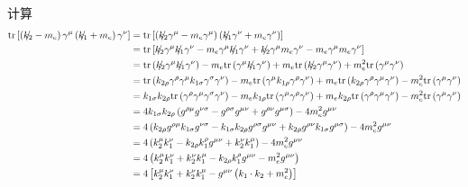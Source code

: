 计算
\begin{equation}
    \begin{aligned}
        \mathrm{tr}\left[ \left( \slashed{k_2}-m_e \right) \gamma ^{\mu}\left( \slashed{k_1}+m_e \right) \gamma ^{\nu} \right] &=\mathrm{tr}\left[ \left( \slashed{k_2}\gamma ^{\mu}-m_e\gamma ^{\mu} \right) \left( \slashed{k_1}\gamma ^{\nu}+m_e\gamma ^{\nu} \right) \right] 
\\
&=\mathrm{tr}\left[ \slashed{k_2}\gamma ^{\mu}\slashed{k_1}\gamma ^{\nu}-m_e\gamma ^{\mu}\slashed{k_1}\gamma ^{\nu}+\slashed{k_2}\gamma ^{\mu}m_e\gamma ^{\nu}-m_e\gamma ^{\mu}m_e\gamma ^{\nu} \right] 
\\
&=\mathrm{tr}\left( \slashed{k_2}\gamma ^{\mu}\slashed{k_1}\gamma ^{\nu} \right) -m_e\mathrm{tr}\left( \gamma ^{\mu}\slashed{k_1}\gamma ^{\nu} \right) +m_e\mathrm{tr}\left( \slashed{k_2}\gamma ^{\mu}\gamma ^{\nu} \right) +m_{e}^{2}\mathrm{tr}\left( \gamma ^{\mu}\gamma ^{\nu} \right) 
\\
&=\mathrm{tr}\left( k_{2\rho}\gamma ^{\rho}\gamma ^{\mu}k_{1\sigma}\gamma ^{\sigma}\gamma ^{\nu} \right) -m_e\mathrm{tr}\left( \gamma ^{\mu}k_{1\rho}\gamma ^{\rho}\gamma ^{\nu} \right) +m_e\mathrm{tr}\left( k_{2\rho}\gamma ^{\rho}\gamma ^{\mu}\gamma ^{\nu} \right) -m_{e}^{2}\mathrm{tr}\left( \gamma ^{\mu}\gamma ^{\nu} \right) 
\\
&=k_{1\sigma}k_{2\rho}\mathrm{tr}\left( \gamma ^{\rho}\gamma ^{\mu}\gamma ^{\sigma}\gamma ^{\nu} \right) -m_ek_{1\rho}\mathrm{tr}\left( \gamma ^{\mu}\gamma ^{\rho}\gamma ^{\nu} \right) +m_ek_{2\rho}\mathrm{tr}\left( \gamma ^{\rho}\gamma ^{\mu}\gamma ^{\nu} \right) -m_{e}^{2}\mathrm{tr}\left( \gamma ^{\mu}\gamma ^{\nu} \right) 
\\
&=4k_{1\sigma}k_{2\rho}\left( g^{\rho \mu}g^{\nu \sigma}-g^{\rho \sigma}g^{\mu \nu}+g^{\rho \nu}g^{\mu \sigma} \right) -4m_{e}^{2}g^{\mu \nu}
\\
&=4\left( k_{2\rho}g^{\rho \mu}k_{1\sigma}g^{\nu \sigma}-k_{1\sigma}k_{2\rho}g^{\rho \sigma}g^{\mu \nu}+k_{2\rho}g^{\rho \nu}k_{1\sigma}g^{\mu \sigma} \right) -4m_{e}^{2}g^{\mu \nu}
\\
&=4\left( k_{2}^{\mu}k_{1}^{\nu}-k_{2\rho}k_{1}^{\rho}g^{\mu \nu}+k_{2}^{\nu}k_{1}^{\mu} \right) -4m_{e}^{2}g^{\mu \nu}
\\
&=4\left( k_{2}^{\mu}k_{1}^{\nu}+k_{2}^{\nu}k_{1}^{\mu}-k_{2\rho}k_{1}^{\rho}g^{\mu \nu}-m_{e}^{2}g^{\mu \nu} \right) 
\\
&=4\left[ k_{2}^{\mu}k_{1}^{\nu}+k_{2}^{\nu}k_{1}^{\mu}-g^{\mu \nu}\left( k_1\cdot k_2+m_{e}^{2} \right) \right] 
    \end{aligned}
\end{equation}
